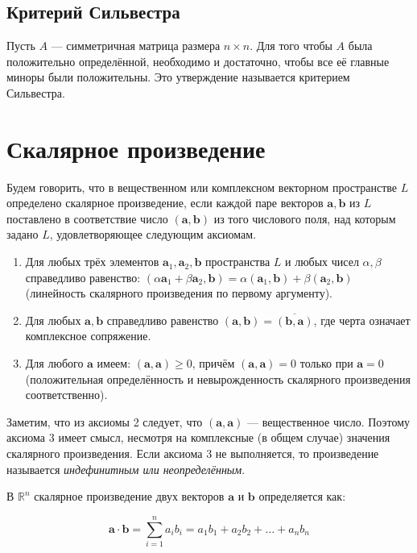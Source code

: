 \documentclass{article}
\begin{document}
\subsection{Критерий Сильвестра}

Пусть $A$ — симметричная матрица размера $n \times n$. Для того чтобы $A$ была положительно определённой, необходимо и достаточно, чтобы все её главные миноры были положительны. Это утверждение называется критерием Сильвестра.

\section{Скалярное произведение}
Будем говорить, что в вещественном или комплексном векторном пространстве $L$ определено скалярное произведение, если каждой паре векторов $\mathbf{a}, \mathbf{b}$ из $L$ поставлено в соответствие число $(\mathbf{a}, \mathbf{b})$ из того числового поля, над которым задано $L$, удовлетворяющее следующим аксиомам.

\begin{enumerate}
    \item Для любых трёх элементов $\mathbf{a}_1, \mathbf{a}_2, \mathbf{b}$ пространства $L$ и любых чисел $\alpha, \beta$ справедливо равенство: $(\alpha \mathbf{a}_1 + \beta \mathbf{a}_2, \mathbf{b}) = \alpha (\mathbf{a}_1, \mathbf{b}) + \beta (\mathbf{a}_2, \mathbf{b})$ (линейность скалярного произведения по первому аргументу).
    \item Для любых $\mathbf{a}, \mathbf{b}$ справедливо равенство $(\mathbf{a}, \mathbf{b}) = \overline{(\mathbf{b}, \mathbf{a})}$, где черта означает комплексное сопряжение.
    \item Для любого $\mathbf{a}$ имеем: $(\mathbf{a}, \mathbf{a}) \geqslant 0$, причём $(\mathbf{a}, \mathbf{a}) = 0$ только при $\mathbf{a} = 0$ (положительная определённость и невырожденность скалярного произведения соответственно).
\end{enumerate}

Заметим, что из аксиомы 2 следует, что $(\mathbf{a}, \mathbf{a})$ — вещественное число. Поэтому аксиома 3 имеет смысл, несмотря на комплексные (в общем случае) значения скалярного произведения. Если аксиома 3 не выполняется, то произведение называется \textit{индефинитным или неопределённым}.

В $\mathbb{R}^n$ скалярное произведение двух векторов $\mathbf{a}$ и $\mathbf{b}$ определяется как:

\[
\mathbf{a} \cdot \mathbf{b} = \sum_{i=1}^{n} a_i b_i = a_1 b_1 + a_2 b_2 + \dots + a_n b_n
\]
\end{document}

